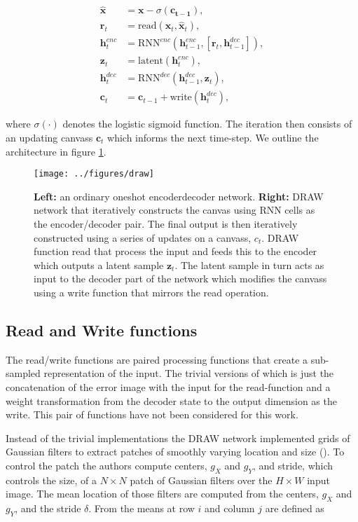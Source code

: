 \begin{align}
\hat{\mathbf{x}} &= \mathbf{x} - \sigma(\mathbf{c_{t-1}}), \\
\mathbf{r}_t &= \text{read}(\mathbf{x}_t, \hat{\mathbf{x}}_t ), \\
\mathbf{h}^{enc}_t &= \text{RNN}^{enc}( \mathbf{h}^{enc}_{t-1}, [\mathbf{r}_t, \mathbf{h}^{dec}_{t-1}]),\\
\mathbf{z}_t &= \text{latent}(\mathbf{h}^{enc}_t),\\
\mathbf{h}^{dec}_t &= \text{RNN}^{dec}( \mathbf{h}^{dec}_{t-1}, \mathbf{z}_t),\\
\mathbf{c}_t &= \mathbf{c}_{t-1} + \text{write}(\mathbf{h}_t^{dec}) \label{eq:draw},
\end{align} 

 \noindent where $\sigma(\cdot)$ denotes the logistic sigmoid function. The iteration then consists of an updating canvass $\mathbf{c}_t$ which informs the next time-step. We outline the architecture in figure \ref{fig:draw}.

\begin{figure}[h]
\centering
\texttt{[image: ../figures/draw]}
\caption[DRAW network architecture]{\textbf{Left:} an ordinary one\-shot encoder\-decoder network. \textbf{Right:} DRAW network that iteratively constructs the canvas using RNN cells as the encoder/decoder pair. The final output is then iteratively constructed using a series of updates on a canvass, $c_t$. DRAW function read that process the input and feeds this to the encoder which outputs a latent sample $\mathbf{z}_t$. The latent sample in turn acts as input to the decoder part of the network which modifies the canvass using a write function that mirrors the read operation.}\label{fig:draw}
\end{figure}
 
 \subsection{Read and Write functions}

 The read/write functions are paired processing functions that create a sub-sampled representation of the input. The trivial versions of which is just the concatenation of the error image with the input for the read-function and a weight transformation from the decoder state to the output dimension as the write. This pair of functions have not been considered for this work. 

 Instead of the trivial implementations the DRAW network implemented grids of Gaussian filters to extract patches of smoothly varying location and size (\cite{Gregor2015}). To control the patch the authors compute centers, $g_X$ and $g_Y$, and stride, which controls the size, of a $N \times N$ patch of Gaussian filters over the $H \times W$ input image. The mean location of those filters are computed from the centers, $g_X$ and $g_Y$, and the stride $\delta$. From \citet{Gregor2015} the means at row $i$ and column $j$ are defined as 

